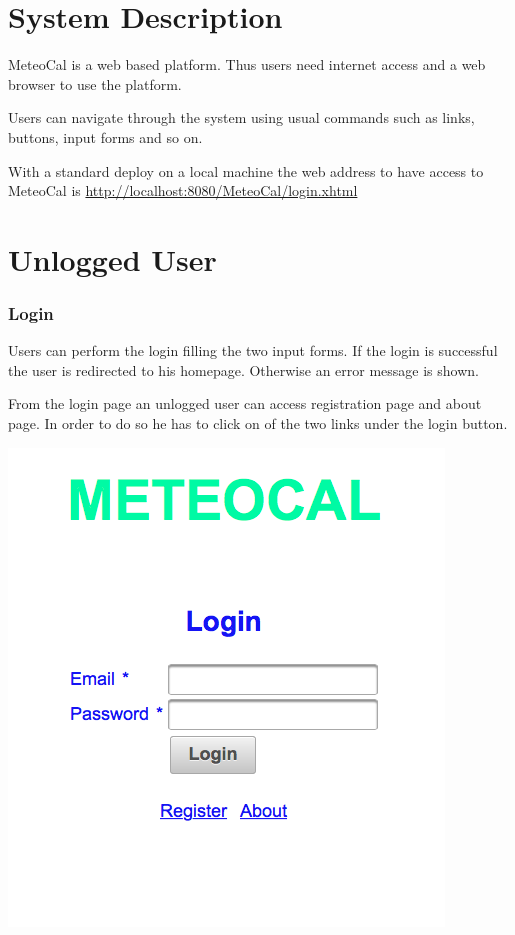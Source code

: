 \documentclass[10pt,a4paper,titlepage]{article}
\begin{document}


\tableofcontents

\pagebreak
\part{System Description}
MeteoCal is a web based platform. Thus users need internet access and a web browser to use the platform.

Users can navigate through the system using usual commands such as links, buttons, input forms and so on.

With a standard deploy on a local machine the web address to have access to MeteoCal is \url{http://localhost:8080/MeteoCal/login.xhtml}

\part{Unlogged User}

\section{Login}
Users can perform the login filling the two input forms. If the login is successful the user is redirected to his homepage. Otherwise an error message is shown.

From the login page an unlogged user can access registration page and about page. In order to do so he has to click on of the two links under the login button.

\begin{center}
\includegraphics[width=0.7\linewidth]{./images/01_login.png}
\end{center}
\end{document}
